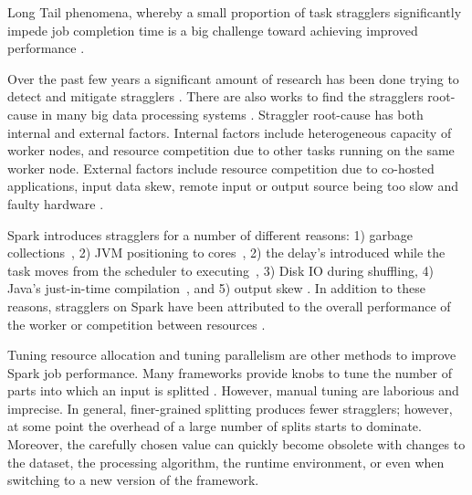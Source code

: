 \label{background}

Long Tail phenomena, whereby a small proportion of task stragglers significantly impede job completion time is a big challenge toward achieving improved performance \cite{Garraghan2016}.

Over the past few years a significant amount of research has been done trying to detect and mitigate stragglers \cite{Rose2012, Dean2004, Chen2014, Bhandare2016, Kwon2012}. 
There are also works to find the stragglers root-cause in many big data processing systems \cite{Ballani2011, Ananthanarayanan2014, Jeyakumar2013, Li2014, Zaharia2012}.
Straggler root-cause has both internal and external factors. Internal factors include heterogeneous capacity of worker nodes, and resource competition due to other tasks running on the same worker node. 
External factors include resource competition due to co-hosted applications, input data skew, remote input or output source being too slow and faulty hardware \cite{Chen2014}.

Spark introduces stragglers for a number of different reasons:  1) garbage collections~\cite{Kyong2017,Ousterhout2017}, 2) JVM positioning to cores~\cite{Kyong2017}, 
2) the delay's introduced while the task moves from the scheduler to executing~\cite{Gittens2016}, 3) Disk IO during shuffling, 4) Java's just-in-time compilation~\cite{Ousterhout2017}, 
and 5) output skew \cite{Ousterhout2017}. 
In addition to these reasons, stragglers on Spark have been attributed to the overall performance of the worker or competition between resources \cite{Yang2016}.

Tuning resource allocation and tuning parallelism are other methods to improve Spark job performance. 
Many frameworks provide knobs to tune the number of parts into which an input is splitted \cite{Rose2012}. 
However, manual tuning are laborious and imprecise. 
In general, finer-grained splitting produces fewer stragglers; however, at some point the overhead of a large number of splits starts to dominate. 
Moreover, the carefully chosen value can quickly become obsolete with changes to the dataset, the processing algorithm, the runtime environment, or even when switching to a new version of the framework.

